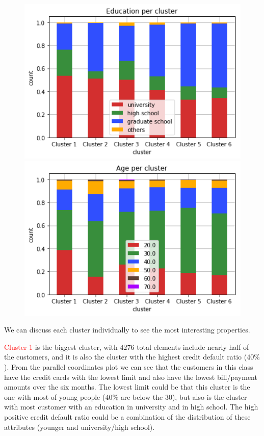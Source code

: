 \begin{figure}[h]
  \begin{minipage}[h]{.50\textwidth}
    \includegraphics[width=1\textwidth]{img/ch3/kmeans_education}
  \end{minipage}
  \begin{minipage}[h]{.50\textwidth}    
    \includegraphics[width=1\textwidth]{img/ch3/kmeans_age}
  \end{minipage}
\end{figure}

We can discuss each cluster individually to see the most interesting properties.

\smallskip

\textcolor{red}{Cluster 1} is the biggest cluster, with $4276$ total elements include nearly half of the customers, and it is also the cluster with the highest credit default ratio ($40\%$). From the parallel coordinates plot we can see that the customers in this class have the credit cards with the lowest limit and also have the lowest bill/payment amounts over the six months. The lowest limit could be that this cluster is the one with most of young people ($40\%$ are below the $30$), but also is the cluster with most customer with an education in university and in high school. The high positive credit default ratio could be a combination of the distribution of these attributes (younger and university/high school).

